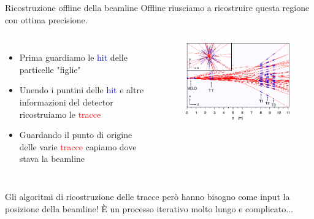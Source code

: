 \documentclass[
10pt,
aspectratio=169,
]{beamer}
\begin{document}
\begin{frame}{Ricostruzione offline della beamline}
    Offline riusciamo a ricostruire questa regione con ottima precisione. 
    \begin{columns}
    \begin{itemize}
        \item Prima guardiamo le \textcolor{blue}{hit} delle particelle "figlie"
        \item Unendo i puntini delle \textcolor{blue}{hit} e altre informazioni del detector ricostruiamo le \textcolor{red}{tracce}
        \item Guardando il punto di origine delle varie \textcolor{red}{tracce} capiamo dove stava la beamline
    \end{itemize}

    \begin{figure}
        \centering
        \includegraphics[width=\textwidth]{lots_of_tracks.png}
    \end{figure}
        \end{columns}
Gli algoritmi di ricostruzione delle tracce però hanno bisogno come input la posizione della beamline!
È un processo iterativo molto lungo e complicato...
\end{frame}
\end{document}
